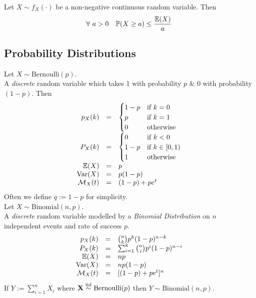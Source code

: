 \documentclass[11pt,a4paper]{article}
\begin{document}
Let $X\sim f_X(\cdot)$ be a non-negative continuous random variable. Then
$$\forall\ a>0\quad\mathbb{P}(X\geq a)\leq\frac{\mathbb{E}(X)}{a}$$

\subsection{Probability Distributions}

Let $X\sim\text{Bernoulli}(p)$.\\
A \textit{discrete} random variable which takes 1 with probability $p$ \& 0 with probability $(1-p)$. Then
\[\begin{array}{rcl}
p_X(k)&=&\begin{cases}1-p&\text{if }k=0\\p&\text{if }k=1\\0&\text{otherwise}\end{cases}\\
P_X(k)&=&\begin{cases}0&\text{if }k<0\\1-p&\text{if }k\in[0,1)\\1&\text{otherwise}\end{cases}\\
\mathbb{E}(X)&=&p\\
\mathrm{Var}(X)&=&p(1-p)\\
\mathcal{M}_X(t)&=&(1-p)+pe^t
\end{array}\]
\nb Often we define $q:=1-p$ for simplicity.\\

Let $X\sim\text{Binomial}(n,p)$.\\
A \textit{discrete} random variable modelled by a \textit{Binomial Distribution} on $n$ independent events and rate of success $p$.\\
\[\begin{array}{rcl}
p_X(k)&=&{n\choose k}p^k(1-p)^{n-k}\\
P_X(k)&=&\sum_{i=1}^k{n\choose i}p^i(1-p)^{n-i}\\
\mathbb{E}(X)&=&np\\
\mathrm{Var}(X)&=&np(1-p)\\
\mathcal{M}_X(t)&=&[(1-p)+pe^t]^n
\end{array}\]
\nb If $Y:=\sum_{i=1}^nX_i$ where $\textbf{X}\overset{\text{iid}}{\sim}\text{Bernoulli}(p)$ then $Y\sim\text{Binomial}(n,p)$.\\
\end{document}
